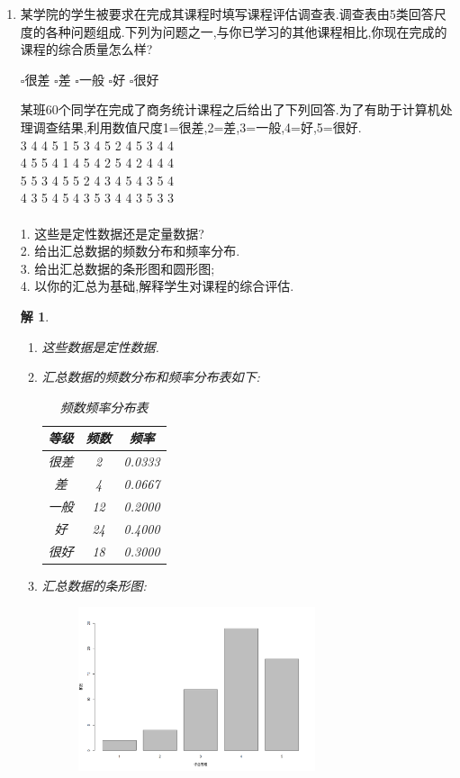\documentclass[11pt,a4paper]{ctexart}
\newtheorem*{solution}{解}
\begin{document}
\begin{enumerate}
\item[2.]某学院的学生被要求在完成其课程时填写课程评估调查表.调查表由5类回答尺度的各种问题组成.下列为问题之一,与你已学习的其他课程相比,你现在完成的课程的综合质量怎么样?

$\square$很差   $\square$差    $\square$一般     $\square$好     $\square$很好

某班60个同学在完成了商务统计课程之后给出了下列回答.为了有助于计算机处理调查结果,利用数值尺度1=很差,2=差,3=一般,4=好,5=很好.\\
3 4 4 5 1 5 3 4 5 2 4 5 3 4 4\\
4 5 5 4 1 4 5 4 2 5 4 2 4 4 4\\
5 5 3 4 5 5 2 4 3 4 5 4 3 5 4\\
4 3 5 4 5 4 3 5 3 4 4 3 5 3 3\\
\\
1. 这些是定性数据还是定量数据?\\
2. 给出汇总数据的频数分布和频率分布.\\
3. 给出汇总数据的条形图和圆形图;\\
4. 以你的汇总为基础,解释学生对课程的综合评估.\\
\begin{solution}

\begin{enumerate}
	\item[1.] 这些数据是定性数据.
	\item[2.] 汇总数据的频数分布和频率分布表如下:
\begin{table}[!htbp]   %
	\caption{频数频率分布表}\label{tab:101} \centering
	\begin{tabular}{ccc}
		\toprule[1.5pt]
		等级 & 频数 & 频率\\
		\midrule[1pt]
		 很差& 2 & 0.0333\\
		差 & 4 & 0.0667\\
		一般 & 12 & 0.2000\\
		好 & 24 & 0.4000\\
		很好 & 18 & 0.3000\\
		\bottomrule[1.5pt]
	\end{tabular}
\end{table}
	
	\item[3.] 汇总数据的条形图:
	\begin{figure}[H]
		\centering
		\includegraphics[width=0.7\textwidth]{1.png}
	\end{figure}


\end{enumerate}
\end{solution}
\end{enumerate}
\end{document}

